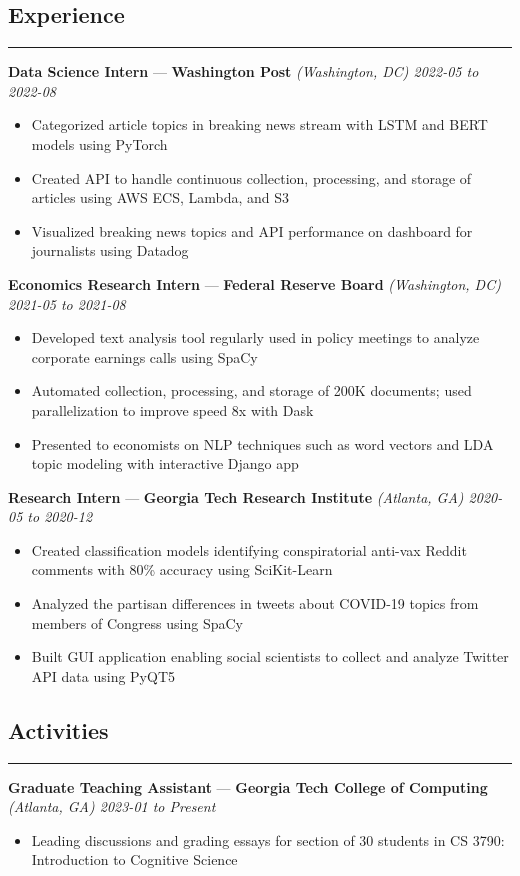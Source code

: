 \documentclass[10pt]{article}
\newcommand{\resumeHeading}[1]{
    \subsection*{#1}
    \hrule
    \vspace*{5pt}
}
\newcommand{\resumeSubHeading}[5]{
    \vspace*{5pt}
    \textbf{#1} — \textbf{#2} \textsl{(#3) \hfill #4 to #5}
}
\begin{document}

\resumeHeading{Experience \vspace{-2.5pt}}

\resumeSubHeading
    {Data Science Intern}
    {Washington Post}
    {Washington, DC}
    {2022-05}
    {2022-08}
\begin{itemize}
    \item Categorized article topics in breaking news stream with LSTM and BERT models using PyTorch
    \item Created API to handle continuous collection, processing, and storage of articles using AWS ECS, Lambda, and S3
    \item Visualized breaking news topics and API performance on dashboard for journalists using Datadog
\end{itemize}

\resumeSubHeading
    {Economics Research Intern}
    {Federal Reserve Board}
    {Washington, DC}
    {2021-05}
    {2021-08}
\begin{itemize}
    \item Developed text analysis tool regularly used in policy meetings to analyze corporate earnings calls using SpaCy
    \item Automated collection, processing, and storage of 200K documents; used parallelization to improve speed 8x with Dask
    \item Presented to economists on NLP techniques such as word vectors and LDA topic modeling with interactive Django app
\end{itemize}

\resumeSubHeading
    {Research Intern}
    {Georgia Tech Research Institute}
    {Atlanta, GA}
    {2020-05}
    {2020-12}
\begin{itemize}
    \item Created classification models identifying conspiratorial anti-vax Reddit comments with 80\% accuracy using SciKit-Learn
    \item Analyzed the partisan differences in tweets about COVID-19 topics from members of Congress using SpaCy
    \item Built GUI application enabling social scientists to collect and analyze Twitter API data using PyQT5
\end{itemize}



\resumeHeading{Activities}

\resumeSubHeading
    {Graduate Teaching Assistant}
    {Georgia Tech College of Computing}
    {Atlanta, GA}
    {2023-01}
    {Present}
\begin{itemize}
    \item Leading discussions and grading essays for section of 30 students in CS 3790: Introduction to Cognitive Science
\end{itemize}
\end{document}
